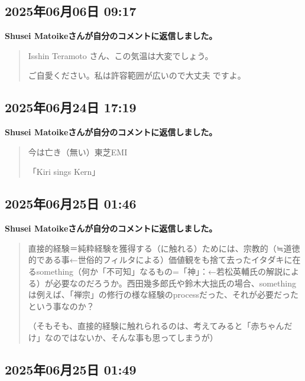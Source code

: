 \subsection*{2025年06月06日 09:17}

\textbf{Shusei Matoikeさんが自分のコメントに返信しました。}

\begin{quote}
Isshin Teramoto さん、この気温は大変でしょう。

ご自愛ください。私は許容範囲が広いので大丈夫🙆ですよ。
\end{quote}

\subsection*{2025年06月24日 17:19}

\textbf{Shusei Matoikeさんが自分のコメントに返信しました。}

\begin{quote}
今は亡き（無い）東芝EMI

「Kiri sings Kern」
\end{quote}

\subsection*{2025年06月25日 01:46}

\textbf{Shusei Matoikeさんが自分のコメントに返信しました。}

\begin{quote}
直接的経験＝純粋経験を獲得する（に触れる）ためには、宗教的（≒道徳的である事←世俗的フィルタによる）価値観をも捨て去ったイタダキに在るsomething（何か「不可知」なるもの=「神」：←若松英輔氏の解説による）が必要なのだろうか。西田幾多郎氏や鈴木大拙氏の場合、somethingは例えば、「禅宗」の修行の様な経験のprocessだった、それが必要だったという事なのか？

（そもそも、直接的経験に触れられるのは、考えてみると「赤ちゃんだけ」なのではないか、そんな事も思ってしまうが）
\end{quote}

\subsection*{2025年06月25日 01:49}

